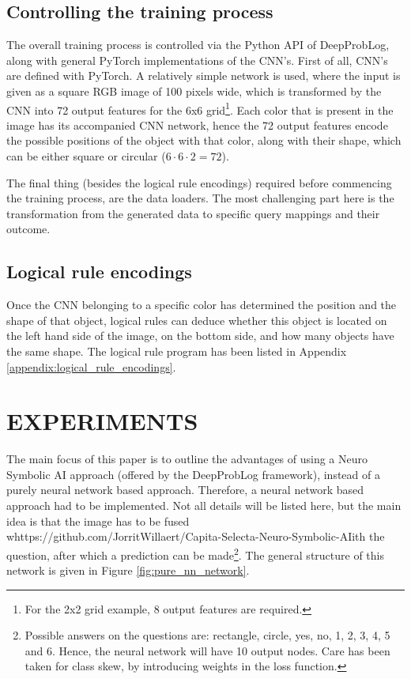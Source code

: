 \documentclass[english]{sobraep}
\begin{document}
\subsection{Controlling the training process}
The overall training process is controlled via the Python API of DeepProbLog, along with general PyTorch implementations of the CNN's.
First of all, CNN's are defined with PyTorch. A relatively simple network is used, where the input is given as a square RGB image of 100 pixels wide, which is transformed by the CNN into 72 output features for the 6x6 grid\footnote{For the 2x2 grid example, 8 output features are required.}. Each color that is present in the image has its accompanied CNN network, hence the 72 output features encode the possible positions of the object with that color, along with their shape, which can be either square or circular ($6 \cdot 6 \cdot 2 = 72$).

The final thing (besides the logical rule encodings) required before commencing the training process, are the data loaders. The most challenging part here is the transformation from the generated data to specific query mappings and their outcome. 

\subsection{Logical rule encodings}
Once the CNN belonging to a specific color has determined the position and the shape of that object, logical rules can deduce whether this object is located on the left hand side of the image, on the bottom side, and how many objects have the same shape. The logical rule program has been listed in Appendix \ref{appendix:logical_rule_encodings}.

\section{EXPERIMENTS}
\label{sec:experiments}
The main focus of this paper is to outline the advantages of using a Neuro Symbolic AI approach (offered by the DeepProbLog framework), instead of a purely neural network based approach. Therefore, a neural network based approach had to be implemented. Not all details will be listed here, but the main idea is that the image has to be fused whttps://github.com/JorritWillaert/Capita-Selecta-Neuro-Symbolic-AIith the question, after which a prediction can be made\footnote{Possible answers on the questions are: rectangle, circle, yes, no, 1, 2, 3, 4, 5 and 6. Hence, the neural network will have 10 output nodes. Care has been taken for class skew, by introducing weights in the loss function.}. The general structure of this network is given in Figure \ref{fig:pure_nn_network}.
\end{document}
